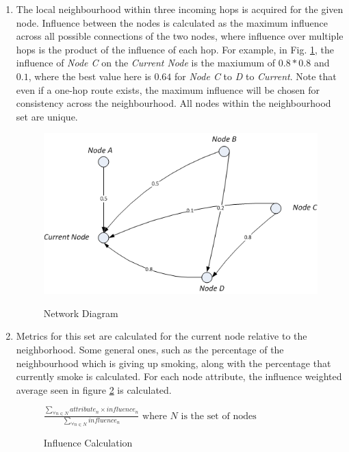 \documentclass[]{article}
\begin{document}
\begin{enumerate}
\item The local neighbourhood within three incoming hops is acquired for the given node. Influence between the nodes is calculated as the maximum influence across all possible connections of the two nodes, where influence over multiple hops is the product of the influence of each hop. For example, in Fig. \ref{networkdiag}, the influence of \emph{Node C} on the \emph{Current Node} is the maxiumum of $0.8 * 0.8$ and $0.1$, where the best value here is $0.64$ for \emph{Node C} to \emph{D} to \emph{Current}. Note that even if a one-hop route exists, the maximum influence will be chosen for consistency across the neighbourhood. All nodes within the neighbourhood set are unique.
\begin{figure}
\begin{center}
\includegraphics{networkdiag.png}
\label{networkdiag}
\caption{Network Diagram}
\end{center}
\end{figure}

\item Metrics for this set are calculated for the current node relative to the neighborhood. Some general ones, such as the percentage of the neighbourhood which is giving up smoking, along with the percentage that currently smoke is calculated. For each node attribute, the influence weighted average seen in figure \ref{inf} is calculated.
\begin{figure}
	\begin{center}
		\begin{math}
		\frac{\sum_{\forall n \in N} attribute_{n} \times influence_{n}}{\sum_{\forall n \in N} influence_{n}} \text{ where } N \text{ is the set of nodes}
		\end{math}
	\end{center}
	\label{inf}
	\caption{Influence Calculation}
\end{figure}



\end{enumerate}
\end{document}
